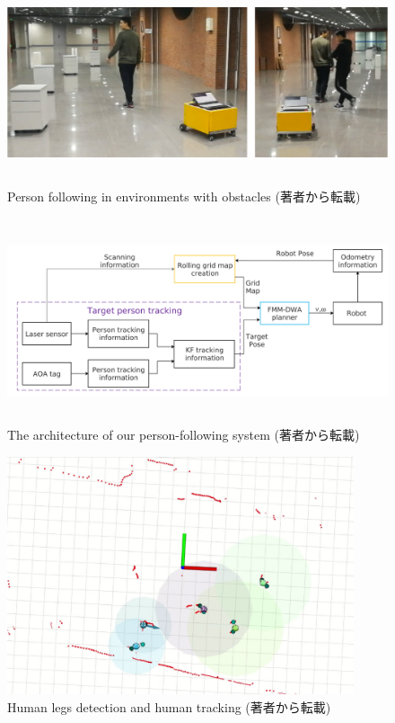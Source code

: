 \begin{figure}[h]
  \begin{center}
  \includegraphics[height=60mm,clip]{figure/2-3_real.png}
  \caption{Person following in environments with obstacles
  (著者\cite{A Robust Autonomous Following Method for Mobile Robots in Dynamic Environments}から転載)}
  \label{2-3_real}
  \end{center}
\end{figure}

\begin{figure}[h]
  \begin{center}
  \includegraphics[height=60mm,clip]{figure/2-3_system.png}
  \caption{The architecture of our person-following system
  (著者\cite{A Robust Autonomous Following Method for Mobile Robots in Dynamic Environments}から転載)}
  \label{2-3_system}
  \end{center}
\end{figure}

\begin{figure}[h]
  \begin{center}
  \includegraphics[height=70mm,clip]{figure/2-3_overview.png}
  \caption{Human legs detection and human tracking
  (著者\cite{A Robust Autonomous Following Method for Mobile Robots in Dynamic Environments}から転載)}
  \label{2-3_overview}
  \end{center}
\end{figure}

